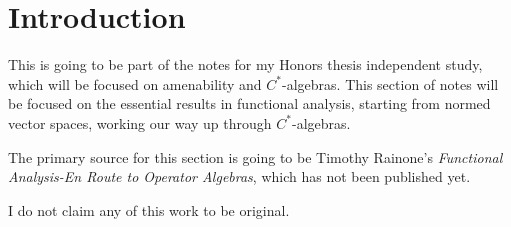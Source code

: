 \documentclass[10pt]{mypackage}
\begin{document}
\RaggedRight
\tableofcontents
\section{Introduction}%
This is going to be part of the notes for my Honors thesis independent study, which will be focused on amenability and $C^{\ast}$-algebras. This section of notes will be focused on the essential results in functional analysis, starting from normed vector spaces, working our way up through $C^{\ast}$-algebras.\newline

The primary source for this section is going to be Timothy Rainone's \textit{Functional Analysis-En Route to Operator Algebras}, which has not been published yet.\newline

I do not claim any of this work to be original.
\end{document}
